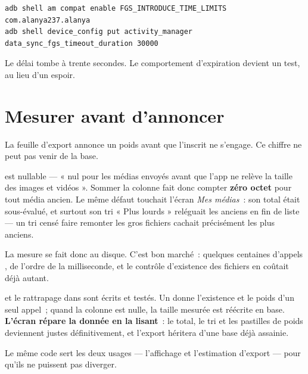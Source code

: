 \documentclass[11pt,a4paper,oneside]{report}
\begin{document}
\begin{note}
\begin{lstlisting}[style=Alanya, language={}]
adb shell am compat enable FGS_INTRODUCE_TIME_LIMITS com.alanya237.alanya
adb shell device_config put activity_manager data_sync_fgs_timeout_duration 30000
\end{lstlisting}
Le délai tombe à trente secondes. Le comportement d'expiration devient un test, au lieu d'un
espoir.
\end{note}

\section{Mesurer avant d'annoncer}
\label{sec:mesure}

La feuille d'export annonce un poids avant que l'inscrit ne s'engage. Ce chiffre ne peut pas
venir de la base.

\begin{alerte}
 est nullable --- « nul pour les médias envoyés avant que l'app ne relève la
taille des images et vidéos ». Sommer la colonne fait donc compter \textbf{zéro octet} pour
tout média ancien. Le même défaut touchait l'écran \emph{Mes médias}~: son total était
sous-évalué, et surtout son tri « Plus lourds » reléguait les anciens en fin de liste ---
un tri censé faire remonter les gros fichiers cachait précisément les plus anciens.
\end{alerte}

La mesure se fait donc au disque. C'est bon marché~: quelques centaines d'appels ,
de l'ordre de la milliseconde, et le contrôle d'existence des fichiers en coûtait déjà autant.

\begin{constat}
 et le rattrapage dans  sont
écrits et testés. Un  donne l'existence et le poids d'un seul appel~; quand la
colonne est nulle, la taille mesurée est réécrite en base. \textbf{L'écran répare la donnée
en la lisant}~: le total, le tri et les pastilles de poids deviennent justes
définitivement, et l'export héritera d'une base déjà assainie.
\end{constat}

Le même code sert les deux usages --- l'affichage et l'estimation d'export --- pour qu'ils ne
puissent pas diverger.
\end{document}
